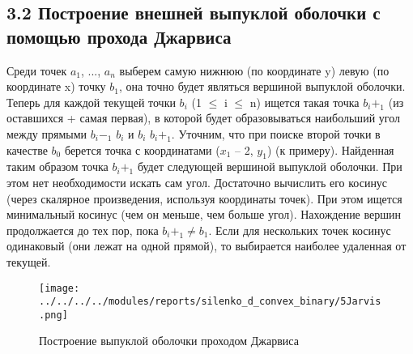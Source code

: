 \documentclass{report}
\begin{document}
\subsection*{3.2 Построение внешней выпуклой оболочки с помощью прохода Джарвиса}
\par Среди точек  $a_1$, ...,  $a_n$ выберем самую нижнюю (по координате y) левую (по координате x) точку $b_1$, она точно будет являться вершиной выпуклой оболочки. Теперь для каждой текущей точки $b_i$ (1 $\leq$ i $\leq$ n) ищется такая точка $b_i+_1$ (из оставшихся + самая первая), в которой будет образовываться наибольший угол между прямыми $b_i-_1$ $b_i$ и $b_i$ $b_i+_1$. Уточним, что при поиске второй точки в качестве $b_0$ берется точка с координатами ($x_1$ – 2, $y_1$) (к примеру). Найденная таким образом точка $b_i+_1$ будет следующей вершиной выпуклой оболочки. При этом нет необходимости искать сам угол. Достаточно вычислить его косинус (через скалярное произведения, используя координаты точек). При этом ищется минимальный косинус (чем он меньше, чем больше угол). Нахождение вершин продолжается до тех пор, пока $b_i+_1 \neq b_1$. Если для нескольких точек косинус одинаковый (они лежат на одной прямой), то выбирается наиболее удаленная от текущей. 
\begin{figure}[htbp]
  \centering
  \texttt{[image: ../../../../modules/reports/silenko\_d\_convex\_binary/5Jarvis.png]}
  \caption{Построение выпуклой оболочки проходом Джарвиса}\label{fig:../../../../modules/reports/silenko_d_convex_binary/5Jarvis.png}
\end{figure}
\end{document}

